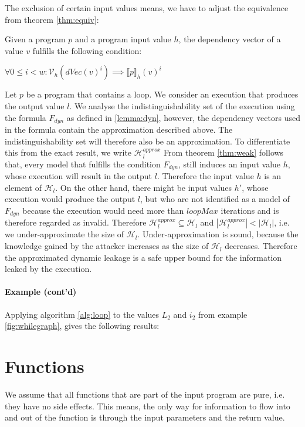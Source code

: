 The exclusion of certain input values means, we have to adjust the equivalence from theorem \ref{thm:equiv}:

\begin{theorem}\label{thm:weak}
    Given a program $p$ and a program input value $h$, the dependency vector of a value $v$ fulfills the following condition:
    \begin{center}
        $\forall 0 \leq i < w: \mathcal{V}_h(dVec(v)^i) \implies \llbracket p \rrbracket_h (v)^i$
    \end{center}
\end{theorem}

Let $p$ be a program that contains a loop. We consider an execution that produces the output value $l$. We analyse the indistinguishability set of the execution using the formula $F_{dyn}$ as defined in \ref{lemma:dyn}, however, the dependency vectors used in the formula contain the approximation described above. The indistinguishability set will therefore also be an approximation. To differentiate this from the exact result, we write $\mathcal{H}_l^{approx}$
From theorem \ref{thm:weak} follows that, every model that fulfills the condition $F_{dyn}$, still induces an input value $h$, whose execution will result in the output $l$. Therefore the input value $h$ is an element of $\mathcal{H}_l$. On the other hand, there might be input values $h'$, whose execution would produce the output $l$, but who are not identified as a model of $F_{dyn}$ because the execution would need more than $loopMax$ iterations and is therefore regarded as invalid.
Therefore $\mathcal{H}_l^{approx} \subseteq \mathcal{H}_l$ and $|\mathcal{H}_l^{approx}| < |\mathcal{H}_l|$, i.e. we under-approximate the size of $\mathcal{H}_l$. Under-approximation is sound, because the knowledge gained by the attacker increases as the size of $\mathcal{H}_l$ decreases. Therefore the approximated dynamic leakage is a safe upper bound for the information leaked by the execution.


\paragraph{Example (cont'd)}
Applying algorithm \ref{alg:loop} to the values $L_2$ and $i_2$ from example \ref{fig:whilegraph}, gives the following results:
\begin{center}
\end{center}

\section{Functions}
We assume that all functions that are part of the input program are pure, i.e. they have no side effects. This means, the only way for information to flow into and out of the function is through the input parameters and the return value.

